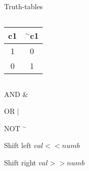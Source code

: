 \begin{frame}{Truth-tables}
\begin{columns}
\begin{column}{0.25\linewidth}
\begin{table}
\begin{center}
\begin{tabular}{|c|c|}
\hline
c1 & $^\sim$c1 \\ \hline
1 & 0  \\ \hline
0 & 1  \\ \hline
\end{tabular}
\end{center}
\end{table}
\end{column}
\end{columns}

\end{frame}

\begin{frame}{AND $\&$}

\end{frame}

\begin{frame}{OR $\vert$}

\end{frame}

\begin{frame}{NOT $^\sim$}

\end{frame}

\begin{frame}{Shift left $val<<numb$}

\end{frame}


\begin{frame}{Shift right $val>>numb$}

\end{frame}